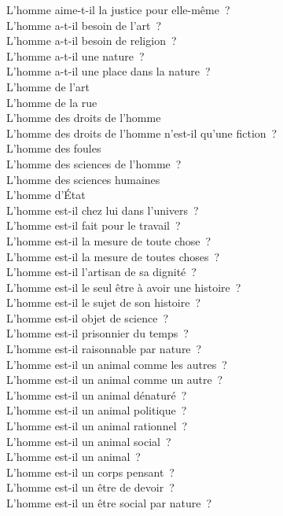 \documentclass[a4paper,12pt]{article}
\begin{document}
L'homme aime-t-il la justice pour elle-même ? \\
L'homme a-t-il besoin de l'art ? \\
L'homme a-t-il besoin de religion ? \\
L'homme a-t-il une nature ? \\
L'homme a-t-il une place dans la nature ? \\
L'homme de l'art \\
L'homme de la rue \\
L'homme des droits de l'homme \\
L'homme des droits de l'homme n'est-il qu'une fiction ? \\
L'homme des foules \\
L'homme des sciences de l'homme ? \\
L'homme des sciences humaines \\
L'homme d'État \\
L'homme est-il chez lui dans l'univers ? \\
L'homme est-il fait pour le travail ? \\
L'homme est-il la mesure de toute chose ? \\
L'homme est-il la mesure de toutes choses ? \\
L'homme est-il l'artisan de sa dignité ? \\
L'homme est-il le seul être à avoir une histoire ? \\
L'homme est-il le sujet de son histoire ? \\
L'homme est-il objet de science ? \\
L'homme est-il prisonnier du temps ? \\
L'homme est-il raisonnable par nature ? \\
L'homme est-il un animal comme les autres ? \\
L'homme est-il un animal comme un autre ? \\
L'homme est-il un animal dénaturé ? \\
L'homme est-il un animal politique ? \\
L'homme est-il un animal rationnel ? \\
L'homme est-il un animal social ? \\
L'homme est-il un animal ? \\
L'homme est-il un corps pensant ? \\
L'homme est-il un être de devoir ? \\
L'homme est-il un être social par nature ? \\
\end{document}
